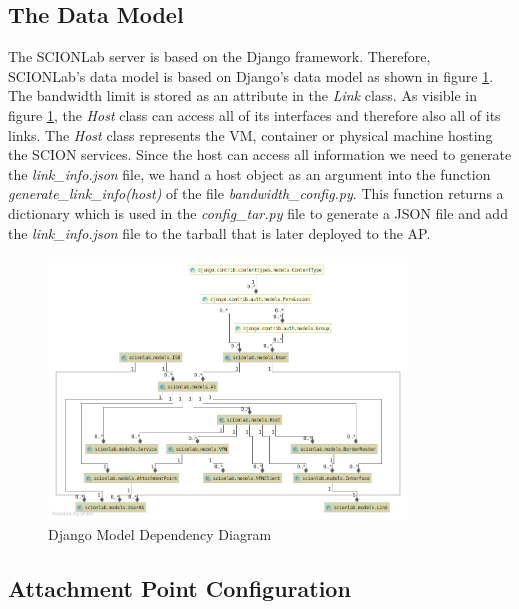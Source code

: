 \newpage
\subsection{The Data Model}

The \acs{SCIONLab} server is based on the Django framework. Therefore, \linebreak \acs{SCIONLab}'s data model is based on Django's data model as shown in figure \ref{Django Model Dependency Diagram}. The bandwidth limit is stored as an attribute in the \textit{Link} class. As visible in figure \ref{Django Model Dependency Diagram}, the \textit{Host} class can access all of its interfaces and therefore also all of its links. The \textit{Host} class represents the \acs{VM}, container or physical machine hosting the \acs{SCION} services. Since the host can access all information we need to generate the \textit{link\_info.json} file, we hand a host object as an argument into the function \textit{generate\_link\_info(host)} of the file \textit{bandwidth\_config.py}. This function returns a dictionary which is used in the \textit{config\_tar.py} file to generate a \acs{JSON} file and add the \textit{link\_info.json} file to the tarball that is later deployed to the \acl{AP}.

\begin{figure}[H]
	\centering
	\includegraphics[width=0.85\textwidth]{img/Django_diagram.png}
	\caption{Django Model Dependency Diagram}
	\label{Django Model Dependency Diagram}
\end{figure}

\subsection{Attachment Point Configuration}

